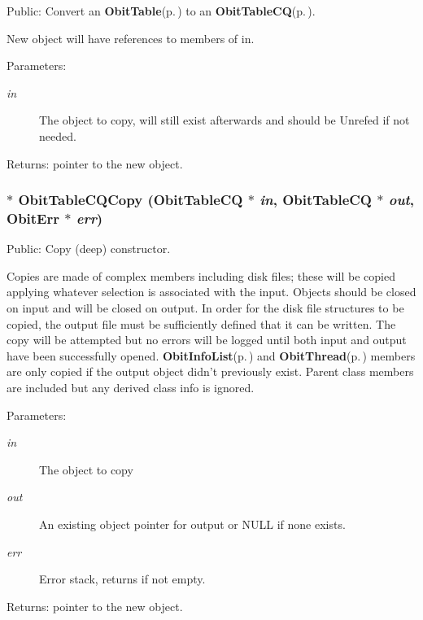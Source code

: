 Public: Convert an {\bf Obit\-Table}{\rm (p.\,\pageref{structObitTable})} to an {\bf Obit\-Table\-CQ}{\rm (p.\,\pageref{structObitTableCQ})}. 

New object will have references to members of in. \begin{Desc}
\item[Parameters:]
\begin{description}
\item[{\em in}]The object to copy, will still exist afterwards and should be Unrefed if not needed. \end{description}
\end{Desc}
\begin{Desc}
\item[Returns:]pointer to the new object. \end{Desc}
\subsubsection{$\ast$ Obit\-Table\-CQCopy ({\bf Obit\-Table\-CQ} $\ast$ {\em in}, {\bf Obit\-Table\-CQ} $\ast$ {\em out}, {\bf Obit\-Err} $\ast$ {\em err})}\label{ObitTableCQ_8h_a14}


Public: Copy (deep) constructor. 

Copies are made of complex members including disk files; these will be copied applying whatever selection is associated with the input. Objects should be closed on input and will be closed on output. In order for the disk file structures to be copied, the output file must be sufficiently defined that it can be written. The copy will be attempted but no errors will be logged until both input and output have been successfully opened. {\bf Obit\-Info\-List}{\rm (p.\,\pageref{structObitInfoList})} and {\bf Obit\-Thread}{\rm (p.\,\pageref{structObitThread})} members are only copied if the output object didn't previously exist. Parent class members are included but any derived class info is ignored. \begin{Desc}
\item[Parameters:]
\begin{description}
\item[{\em in}]The object to copy \item[{\em out}]An existing object pointer for output or NULL if none exists. \item[{\em err}]Error stack, returns if not empty. \end{description}
\end{Desc}
\begin{Desc}
\item[Returns:]pointer to the new object. \end{Desc}
